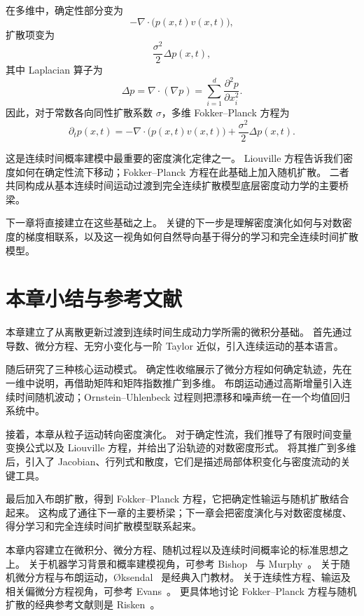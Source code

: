 在多维中，确定性部分变为
\[
-\nabla\cdot\bigl(p(x,t)v(x,t)\bigr),
\]
扩散项变为
\[
\frac{\sigma^2}{2}\Delta p(x,t),
\]
其中 Laplacian 算子为
\[
\Delta p
=
\nabla\cdot(\nabla p)
=
\sum_{i=1}^d \frac{\partial^2 p}{\partial x_i^2}.
\]
因此，对于常数各向同性扩散系数 $\sigma$，多维 Fokker--Planck 方程为
\[
\boxed{
\partial_t p(x,t)
=
-\nabla\cdot\bigl(p(x,t)v(x,t)\bigr)
+
\frac{\sigma^2}{2}\Delta p(x,t).
}
\]

这是连续时间概率建模中最重要的密度演化定律之一。
Liouville 方程告诉我们密度如何在确定性流下移动；Fokker--Planck 方程在此基础上加入随机扩散。
二者共同构成从基本连续时间运动过渡到完全连续扩散模型底层密度动力学的主要桥梁。

下一章将直接建立在这些基础之上。
关键的下一步是理解密度演化如何与对数密度的梯度相联系，以及这一视角如何自然导向基于得分的学习和完全连续时间扩散模型。

\section*{本章小结与参考文献}

本章建立了从离散更新过渡到连续时间生成动力学所需的微积分基础。
首先通过导数、微分方程、无穷小变化与一阶 Taylor 近似，引入连续运动的基本语言。

随后研究了三种核心运动模式。
确定性收缩展示了微分方程如何确定轨迹，先在一维中说明，再借助矩阵和矩阵指数推广到多维。
布朗运动通过高斯增量引入连续时间随机波动；Ornstein--Uhlenbeck 过程则把漂移和噪声统一在一个均值回归系统中。

接着，本章从粒子运动转向密度演化。
对于确定性流，我们推导了有限时间变量变换公式以及 Liouville 方程，并给出了沿轨迹的对数密度形式。
将其推广到多维后，引入了 Jacobian、行列式和散度，它们是描述局部体积变化与密度流动的关键工具。

最后加入布朗扩散，得到 Fokker--Planck 方程，它把确定性输运与随机扩散结合起来。
这构成了通往下一章的主要桥梁；下一章会把密度演化与对数密度梯度、得分学习和完全连续时间扩散模型联系起来。

\bigskip

本章内容建立在微积分、微分方程、随机过程以及连续时间概率论的标准思想之上。
关于机器学习背景和概率建模视角，可参考 Bishop~\cite{bishop2006prml} 与 Murphy~\cite{murphy2012ml}。
关于随机微分方程与布朗运动，Øksendal~\cite{oksendal2003sde} 是经典入门教材。
关于连续性方程、输运及相关偏微分方程视角，可参考 Evans~\cite{evans2010pde}。
更具体地讨论 Fokker--Planck 方程与随机扩散的经典参考文献则是 Risken~\cite{risken1996fokker}。

